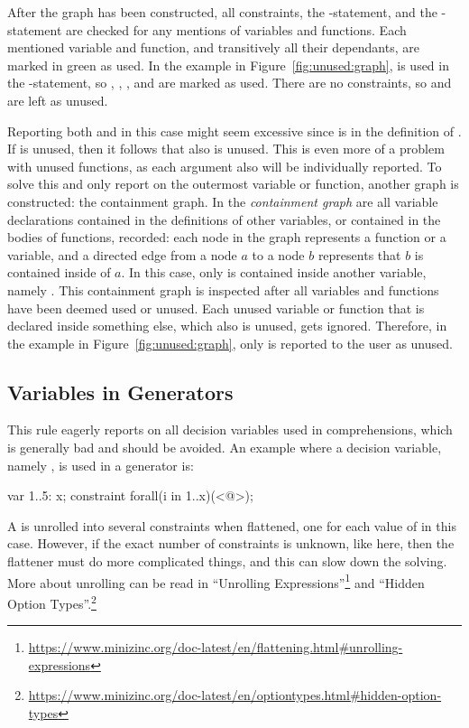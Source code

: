 \documentclass[a4paper,12pt]{article}
\begin{document}
After the graph has been constructed, all constraints, the -statement, and the -statement are checked for any
mentions of variables and functions. Each mentioned variable and function, and transitively all their
dependants, are marked in green as used. In the example in Figure~\ref{fig:unused:graph},
 is used in the -statement, so
, , , and  are marked as used. There are no
constraints, so  and  are left as unused.

Reporting both  and  in this case might seem excessive since  is
in the definition of . If  is unused, then it follows that  also is unused.
This is even more of a problem with unused functions, as each argument also
will be individually reported. To solve this and only report on the outermost
variable or function, another graph is constructed: the containment graph.
In the \emph{containment graph} are all variable declarations contained in the definitions of other variables, or contained in the bodies of functions, recorded:
each node in the graph represents a function or a variable, and a directed edge from a node $a$ to a node $b$
represents that $b$ is contained inside of $a$.
In this case,
only  is contained inside another variable, namely . This containment graph is
inspected after all variables and functions have been deemed used or unused. Each
unused variable or function that is declared inside something else, which also is unused, gets
ignored. Therefore, in the example in Figure~\ref{fig:unused:graph}, only  is reported to the user as unused.

\subsection{Variables in Generators}\label{sec:rule:vargen}
This rule eagerly reports on all decision variables used in comprehensions, which is generally
bad and should be avoided. An example where a decision variable, namely , is used in a generator is:
\begin{mznnobreak}
var 1..5: x;
constraint forall(i in 1..x)(<@\dots@>);
\end{mznnobreak}
A  is unrolled into several constraints when flattened, one for each
value of  in this case. However, if the exact number of constraints is unknown, like here, then the
flattener must do more complicated things, and this can slow down the solving. More about unrolling can be read in ``Unrolling
Expressions''\footnote{\url{https://www.minizinc.org/doc-latest/en/flattening.html\#unrolling-expressions}}
and ``Hidden Option Types''.\footnote{\url{https://www.minizinc.org/doc-latest/en/optiontypes.html\#hidden-option-types}}
\end{document}
